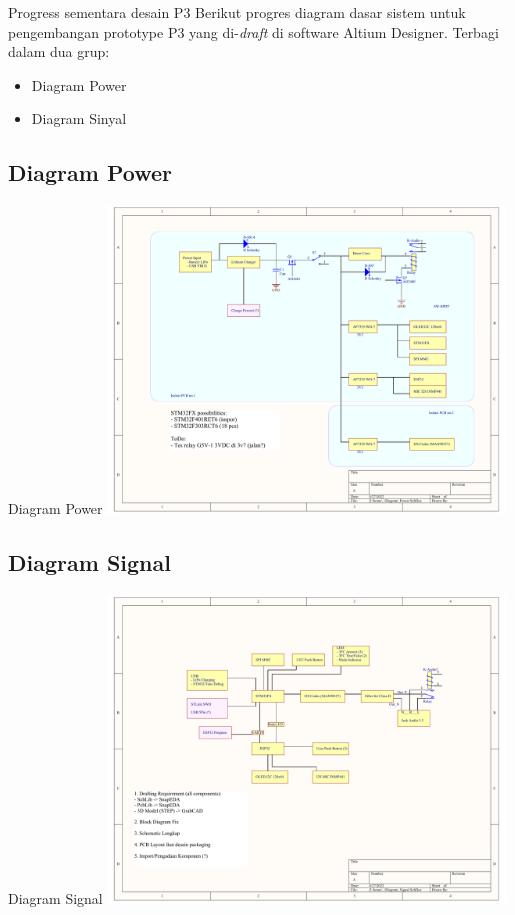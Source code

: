 \documentclass[table,dvipsnames]{beamer}
\begin{document}
	\begin{frame}
		\begin{exampleblock}{Progress sementara desain P3}
			Berikut progres diagram dasar sistem untuk pengembangan prototype P3 yang di-\textit{draft} di software Altium Designer.
			Terbagi dalam dua grup:
			\begin{itemize}
				\item Diagram Power
				\item Diagram Sinyal
			\end{itemize}
		\end{exampleblock}
	\end{frame}

	\begin{frame}
		\subsection{Diagram Power}
		\begin{exampleblock}{Diagram Power}
			\centering
			\includegraphics[width=300pt]{images/diagram_power}
		\end{exampleblock}
	\end{frame}

	\begin{frame}
		\subsection{Diagram Signal}
		\begin{exampleblock}{Diagram Signal}
			\centering
			\includegraphics[width=300pt]{images/diagram_signal}
		\end{exampleblock}
	\end{frame}
\end{document}
